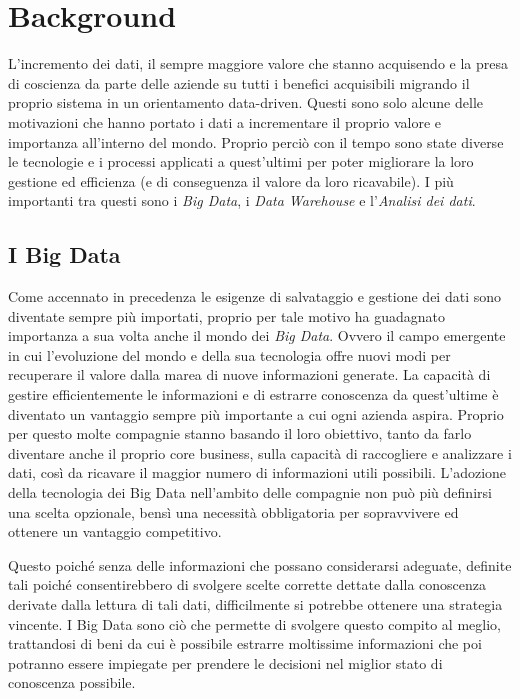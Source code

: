 \chapter{Background}
\label{ch:Background}

L'incremento dei dati, il sempre maggiore valore che stanno acquisendo e la presa di coscienza da parte delle aziende su tutti i benefici acquisibili migrando il proprio sistema in un orientamento data-driven. Questi sono solo alcune delle motivazioni che hanno portato i dati a incrementare il proprio valore e importanza all'interno del mondo. Proprio perciò con il tempo sono state diverse le tecnologie e i processi applicati a quest'ultimi per poter migliorare la loro gestione ed efficienza (e di conseguenza il valore da loro ricavabile). I più importanti tra questi sono i \textit{Big Data}, i \textit{Data Warehouse} e l'\textit{Analisi dei dati}.

\section{I Big Data}

Come accennato in precedenza le esigenze di salvataggio e gestione dei dati sono diventate sempre più importati, proprio per tale motivo ha guadagnato importanza a sua volta anche il mondo dei \textit{Big Data}. Ovvero il campo emergente in cui l'evoluzione del mondo e della sua tecnologia offre nuovi modi per recuperare il valore dalla marea di nuove informazioni generate. La capacità di gestire efficientemente le informazioni e di estrarre conoscenza da quest'ultime è diventato un vantaggio sempre più importante a cui ogni azienda aspira. Proprio per questo molte compagnie stanno basando il loro obiettivo, tanto da farlo diventare anche il proprio core business, sulla capacità di raccogliere e analizzare i dati, così da ricavare il maggior numero di informazioni utili possibili. L'adozione della tecnologia dei Big Data nell'ambito delle compagnie non può più definirsi una scelta opzionale, bensì una necessità obbligatoria per sopravvivere ed ottenere un vantaggio competitivo.\cite{new_horizon_for_a_data_driven_economy}

Questo poiché senza delle informazioni che possano considerarsi adeguate, definite tali poiché consentirebbero di svolgere scelte corrette dettate dalla conoscenza derivate dalla lettura di tali dati, difficilmente si potrebbe ottenere una strategia vincente. I Big Data sono ciò che permette di svolgere questo compito al meglio, trattandosi di beni da cui è possibile estrarre moltissime informazioni che poi potranno essere impiegate per prendere le decisioni nel miglior stato di conoscenza possibile.\cite{iusitinere_big_data}

